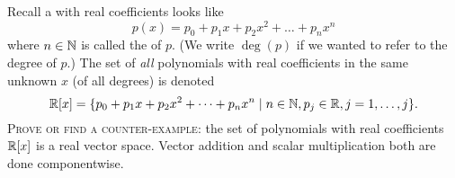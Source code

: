 \begin{exercise}
  Recall a  with real coefficients looks like
  \begin{equation}
p(x) = p_{0} + p_{1}x + p_{2}x^{2} + \dots + p_{n}x^{n}
  \end{equation}
  where $n\in\mathbb{N}$ is called the  of $p$. (We write
  $\deg(p)$ if we wanted to refer to the degree of $p$.) The set of
  \emph{all} polynomials with real coefficients in the same unknown $x$
  (of all degrees) is denoted
  \begin{equation}
\mathbb{R}[x] = \{p_{0} + p_{1}x + p_{2}x^{2} + \dots + p_{n}x^{n}\mid n\in\mathbb{N},
  p_{j}\in\mathbb{R}, j=1,\dots,j\}.
  \end{equation}
  \textsc{Prove or find a counter-example:} the set of polynomials with real
  coefficients $\mathbb{R}[x]$ is a real vector space.
  Vector addition and scalar multiplication both are done componentwise.
\end{exercise}

